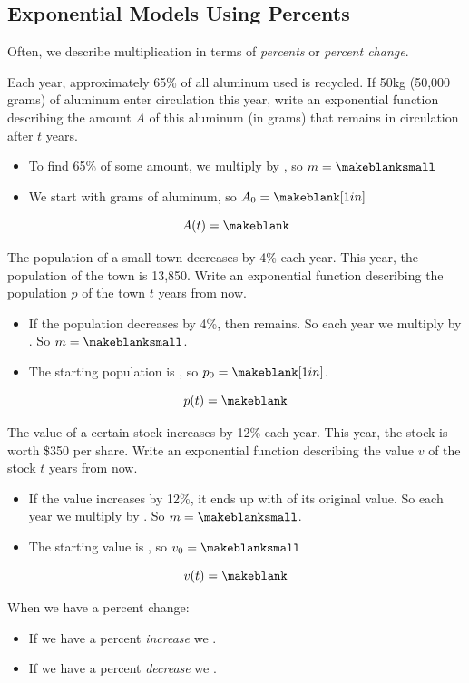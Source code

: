 \subsection{Exponential Models Using Percents} 
Often, we describe multiplication in terms of \emph{percents} or \emph{percent change}.
\begin{Example}
Each year, approximately 65\% of all aluminum used is recycled. If 50\;kg (50,000 grams) of aluminum enter circulation this year, write an exponential function describing the amount $A$ of this aluminum (in grams) that remains in circulation after $t$ years.
\begin{itemize}
\item To find 65\% of some amount, we multiply by \makeblanksmall, so $m=\makeblanksmall$
\item We start with \makeblank[1in] grams of aluminum, so $A_0=\makeblank[1in]$
\end{itemize}
\[
A(t)=\makeblank
\]
\end{Example}
\begin{Example}
The population of a small town decreases by 4\% each year. This year, the population of the town is 13,850. Write an exponential function describing the population $p$ of the town $t$ years from now.
\begin{itemize}
\item If the population decreases by 4\%, then \makeblank remains. So each year we multiply by \makeblank. So $m=\makeblanksmall$.
\item The starting population is \makeblank[1in], so $p_0=\makeblank[1in]$.
\end{itemize}
\[
p(t)=\makeblank
\]
\end{Example}
\begin{Example}
The value of a certain stock increases by 12\% each year. This year, the stock is worth \$350 per share. Write an exponential function describing the value $v$ of the stock $t$ years from now.
\begin{itemize}
\item If the value increases by 12\%, it ends up with \makeblank of its original value. So each year we multiply by \makeblank. So $m=\makeblanksmall$.
\item The starting value is \makeblank[1in], so $v_0=\makeblanksmall$
\end{itemize}
\[
v(t)=\makeblank
\]
\end{Example}
\noindent When we have a percent change:
\begin{itemize}
\item If we have a percent \emph{increase} we \makeblank.
\item If we have a percent \emph{decrease} we \makeblank.
\end{itemize}

